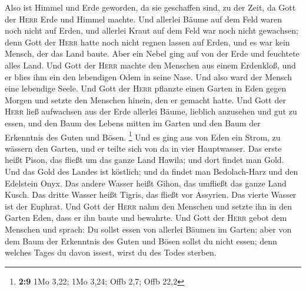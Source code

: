  Also ist Himmel und Erde geworden, da sie geschaffen
sind, zu der Zeit, da Gott der \textsc{Herr} Erde und Himmel machte.
 Und allerlei Bäume auf dem Feld waren noch nicht auf
Erden, und allerlei Kraut auf dem Feld war noch nicht gewachsen; denn
Gott der \textsc{Herr} hatte noch nicht regnen lassen auf Erden, und es
war kein Mensch, der das Land baute.  Aber ein Nebel ging
auf von der Erde und feuchtete alles Land.  Und Gott der
\textsc{Herr} machte den Menschen aus einem Erdenkloß, und er blies ihm
ein den lebendigen Odem in seine Nase. Und also ward der Mensch eine
lebendige Seele.  Und Gott der \textsc{Herr} pflanzte
einen Garten in Eden gegen Morgen und setzte den Menschen hinein, den er
gemacht hatte.  Und Gott der \textsc{Herr} ließ aufwachsen
aus der Erde allerlei Bäume, lieblich anzusehen und gut zu essen, und
den Baum des Lebens mitten im Garten und den Baum der Erkenntnis des
Guten und Bösen. \footnote{\textbf{2:9} 1Mo 3,22; 1Mo 3,24; Offb 2,7;
  Offb 22,2}  Und es ging aus von Eden ein Strom, zu
wässern den Garten, und er teilte sich von da in vier Hauptwasser.
 Das erste heißt Pison, das fließt um das ganze Land
Hawila; und dort findet man Gold.  Und das Gold des
Landes ist köstlich; und da findet man Bedolach-Harz und den Edelstein
Onyx.  Das andere Wasser heißt Gihon, das umfließt das
ganze Land Kusch.  Das dritte Wasser heißt Tigris, das
fließt vor Assyrien. Das vierte Wasser ist der Euphrat. 
Und Gott der \textsc{Herr} nahm den Menschen und setzte ihn in den
Garten Eden, dass er ihn baute und bewahrte.  Und Gott
der \textsc{Herr} gebot dem Menschen und sprach: Du sollst essen von
allerlei Bäumen im Garten;  aber von dem Baum der
Erkenntnis des Guten und Bösen sollst du nicht essen; denn welches Tages
du davon issest, wirst du des Todes sterben.

